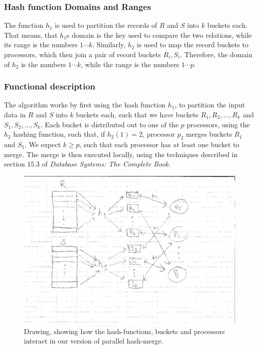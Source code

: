 \documentclass[a4paper, 12pt]{article}
\begin{document}
\subsubsection*{Hash function Domains and Ranges}

The function $h_1$ is used to partition the records of $R$ and $S$
into $k$ buckets each. That means, that $h_1$s domain is the key used
to compare the two relations, while its range is the numbers $1\cdots
k$. Similarly, $h_2$ is used to map the record buckets to processors,
which then join a pair of record buckets $R_i, S_i$. Therefore, the
domain of $h_2$ is the numbers $1 \cdots k$, while the range is the
numbers $1 \cdots p$.

\subsubsection*{Functional description}

The algorithm works by first using the hash function $h_1$, to
partition the input data in $R$ and $S$ into $k$ buckets each, such
that we have buckets $R_1, R_2, \ldots, R_k$ and $S_1, S_2, \dots,
S_k$. Each bucket is distributed out to one of the $p$ processors,
using the $h_2$ hashing function, such that, if $h_2(1) = 2$,
processor $p_2$ merges buckets $R_1$ and $S_1$. We expect $k \geq p$,
such that each processor has at least one bucket to merge. The merge
is then executed locally, using the techniques described in section
15.3 of \emph{Database Systems: The Complete Book}.

\begin{figure}
  \center
  \includegraphics[scale=0.6]{parallelmerge.eps}
  \caption{Drawing, showing how the hash-functions, buckets and
    processors interact in our version of parallel hash-merge.}
  \label{fig1}
\end{figure}
\end{document}
